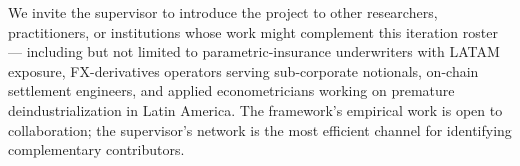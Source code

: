 We invite the supervisor to introduce the project to other researchers, practitioners, or institutions whose work might complement this iteration roster --- including but not limited to parametric-insurance underwriters with LATAM exposure, FX-derivatives operators serving sub-corporate notionals, on-chain settlement engineers, and applied econometricians working on premature deindustrialization in Latin America. The framework's empirical work is open to collaboration; the supervisor's network is the most efficient channel for identifying complementary contributors.





